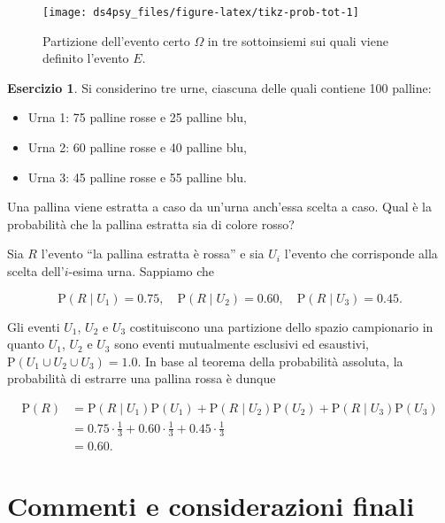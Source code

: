\documentclass[
  11pt,
]{krantz}
\providecommand{\tightlist}{%
  \setlength{\itemsep}{0pt}\setlength{\parskip}{0pt}}
\theoremstyle{definition}
\theoremstyle{definition}
\theoremstyle{definition}
\newtheorem{exercise}{Esercizio}[chapter]
\theoremstyle{definition}
\theoremstyle{remark}
\begin{document}
\begin{figure}

{\centering \texttt{[image: ds4psy\_files/figure-latex/tikz-prob-tot-1]} 

}

\caption{Partizione dell'evento certo $\Omega$ in tre sottoinsiemi sui quali viene definito l'evento $E$.}\label{fig:tikz-prob-tot}
\end{figure}

\begin{exercise}
Si considerino tre urne, ciascuna delle quali contiene 100 palline:

\begin{itemize}
\tightlist
\item
  Urna 1: 75 palline rosse e 25 palline blu,
\item
  Urna 2: 60 palline rosse e 40 palline blu,
\item
  Urna 3: 45 palline rosse e 55 palline blu.
\end{itemize}

\noindent Una pallina viene estratta a caso da un'urna anch'essa scelta a caso. Qual è la probabilità che la pallina estratta sia di colore rosso?

Sia \(R\) l'evento ``la pallina estratta è rossa'' e sia \(U_i\) l'evento che corrisponde alla scelta dell'\(i\)-esima urna. Sappiamo che

\[
{\mbox{P}}(R \mid U_1) = 0.75, \quad {\mbox{P}}(R \mid U_2) = 0.60, \quad {\mbox{P}}(R \mid U_3) = 0.45.
\]

Gli eventi \(U_1\), \(U_2\) e \(U_3\) costituiscono una partizione dello spazio campionario in quanto \(U_1\), \(U_2\) e \(U_3\) sono eventi mutualmente esclusivi ed esaustivi, \({\mbox{P}}(U_1 \cup U_2 \cup U_3) = 1.0\). In base al teorema della probabilità assoluta, la probabilità di estrarre una pallina rossa è dunque

\[
\begin{split}
{\mbox{P}}(R) &= {\mbox{P}}(R \mid U_1){\mbox{P}}(U_1)+{\mbox{P}}(R \mid U_2){\mbox{P}}(U_2)+{\mbox{P}}(R \mid U_3){\mbox{P}}(U_3) \\
&= 0.75 \cdot \frac{1}{3}+0.60 \cdot \frac{1}{3}+0.45 \cdot \frac{1}{3} \\
&=0.60.
\end{split}
\]
\end{exercise}

\hypertarget{commenti-e-considerazioni-finali-1}{%
\section*{Commenti e considerazioni finali}\label{commenti-e-considerazioni-finali-1}}
\end{document}
